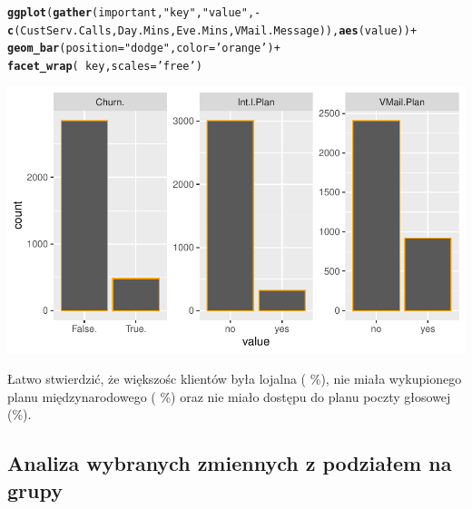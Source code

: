 \documentclass{article}\usepackage[]{graphicx}\usepackage[]{color}
\makeatletter
\def\maxwidth{ %
  \ifdim\Gin@nat@width>\linewidth
    \linewidth
  \else
    \Gin@nat@width
  \fi
}
\newcommand{\hlstr}[1]{\textcolor[rgb]{0.192,0.494,0.8}{#1}}%
\newcommand{\hlopt}[1]{\textcolor[rgb]{0,0,0}{#1}}%
\newcommand{\hlstd}[1]{\textcolor[rgb]{0.345,0.345,0.345}{#1}}%
\newcommand{\hlkwc}[1]{\textcolor[rgb]{0.333,0.667,0.333}{#1}}%
\newcommand{\hlkwd}[1]{\textcolor[rgb]{0.737,0.353,0.396}{\textbf{#1}}}%
\newenvironment{kframe}{%
 \def\at@end@of@kframe{}%
 \ifinner\ifhmode%
  \def\at@end@of@kframe{\end{minipage}}%
  \begin{minipage}{\columnwidth}%
 \fi\fi%
 \def\FrameCommand##1{\hskip\@totalleftmargin \hskip-\fboxsep
 \colorbox{shadecolor}{##1}\hskip-\fboxsep
     \hskip-\linewidth \hskip-\@totalleftmargin \hskip\columnwidth}%
 \MakeFramed {\advance\hsize-\width
   \@totalleftmargin\z@ \linewidth\hsize
   \@setminipage}}%
 {\par\unskip\endMakeFramed%
 \at@end@of@kframe}
\newenvironment{knitrout}{}{} %
\makeatother
\begin{document}
\begin{knitrout}
\color{fgcolor}\begin{kframe}
\begin{alltt}
\hlkwd{ggplot}\hlstd{(}\hlkwd{gather}\hlstd{(important,} \hlstr{"key"}\hlstd{,} \hlstr{"value"}\hlstd{,} \hlopt{-}\hlkwd{c}\hlstd{(CustServ.Calls, Day.Mins, Eve.Mins, VMail.Message)),} \hlkwd{aes}\hlstd{(value))} \hlopt{+}
  \hlkwd{geom_bar}\hlstd{(}\hlkwc{position}\hlstd{=}\hlstr{"dodge"}\hlstd{,} \hlkwc{color}\hlstd{=}\hlstr{'orange'}\hlstd{)} \hlopt{+}
  \hlkwd{facet_wrap}\hlstd{(}\hlopt{~}\hlstd{key,} \hlkwc{scales}\hlstd{=}\hlstr{'free'}\hlstd{)}
\end{alltt}
\end{kframe}

{\centering \includegraphics[width=\maxwidth]{figure/slupkowe_dla_wybranych-1} 

}



\end{knitrout}
Łatwo stwierdzić, że większośc klientów była lojalna ( \%), nie miała wykupionego planu międzynarodowego ( \%) oraz nie miało dostępu do planu poczty głosowej (\%).  

\subsection{Analiza wybranych zmiennych z podziałem na grupy}
\end{document}
